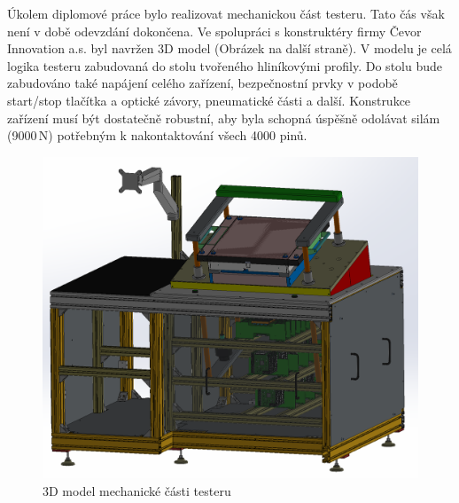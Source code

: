 Úkolem diplomové práce bylo realizovat mechanickou část testeru. Tato čás však není v době odevzdání dokončena.
Ve spolupráci s konstruktéry firmy Čevor Innovation a.s. byl navržen 3D model (Obrázek na další straně).
V modelu je celá logika testeru zabudovaná do stolu tvořeného hliníkovými profily.
Do stolu bude zabudováno také napájení celého zařízení, bezpečnostní prvky
v podobě start/stop tlačítka a optické závory, pneumatické části a další.
Konstrukce zařízení musí být dostatečně robustní, aby byla schopná úspěšně odolávat silám (9000\,N)
potřebným k nakontaktování všech 4000 pinů.
\clearpage

\begin{figure}[ht!]
    \centering
    \includegraphics[width = 1\textwidth]{obrazky/assembly_3D_model.png}
    \caption{3D model mechanické části testeru}
    \label{fig: assembly model}
\end{figure}

